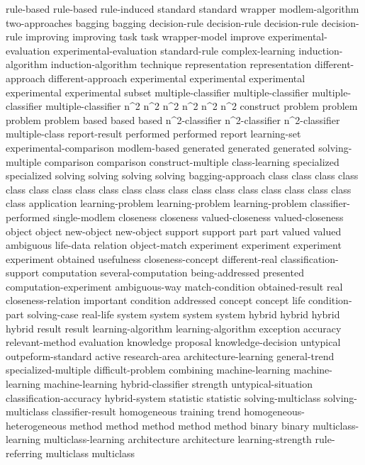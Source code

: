 rule-based	rule-based	
rule-induced	
standard	standard	
wrapper	
modlem-algorithm	
two-approaches	
bagging	bagging	
decision-rule	decision-rule	decision-rule	decision-rule	
improving	improving	
task	task	
wrapper-model	
improve	
experimental-evaluation	experimental-evaluation	
standard-rule	
complex-learning	
induction-algorithm	induction-algorithm	
technique	
representation	representation	
different-approach	different-approach	
experimental	experimental	experimental	experimental	experimental	
subset	
multiple-classifier	multiple-classifier	multiple-classifier	multiple-classifier	
n^2	n^2	n^2	n^2	n^2	n^2	
construct	
problem	problem	problem	problem	
based	based	based	
n^2-classifier	n^2-classifier	n^2-classifier	
multiple-class	
report-result	
performed	performed	
report	
learning-set	
experimental-comparison	
modlem-based	
generated	generated	generated	
solving-multiple	
comparison	comparison	
construct-multiple	
class-learning	
specialized	specialized	
solving	solving	solving	solving	
bagging-approach	
class	class	class	class	class	class	class	class	class	class	class	class	class	class	class	class	class	class	class	class	
application	
learning-problem	learning-problem	learning-problem	
classifier-performed	
single-modlem	
closeness	closeness	
valued-closeness	valued-closeness	
object	object	
new-object	new-object	
support	support	
part	part	
valued	valued	
ambiguous	
life-data	
relation	
object-match	
experiment	experiment	experiment	experiment	
obtained	
usefulness	
closeness-concept	
different-real	
classification-support	
computation	
several-computation	
being-addressed	
presented	
computation-experiment	
ambiguous-way	
match-condition	
obtained-result	
real	
closeness-relation	
important	
condition	
addressed	
concept	concept	
life	
condition-part	
solving-case	
real-life	
system	system	system	system	
hybrid	hybrid	hybrid	hybrid	
result	result	
learning-algorithm	learning-algorithm	
exception	
accuracy	
relevant-method	
evaluation	
knowledge	
proposal	
knowledge-decision	
untypical	
outpeform-standard	
active	
research-area	
architecture-learning	
general-trend	
specialized-multiple	
difficult-problem	
combining	
machine-learning	machine-learning	machine-learning	
hybrid-classifier	
strength	
untypical-situation	
classification-accuracy	
hybrid-system	
statistic	statistic	
solving-multiclass	solving-multiclass	
classifier-result	
homogeneous	
training	
trend	
homogeneous-heterogeneous	
method	method	method	method	method	
binary	binary	
multiclass-learning	multiclass-learning	
architecture	architecture	
learning-strength	
rule-referring	
multiclass	multiclass	
